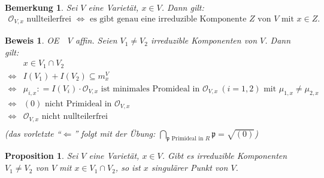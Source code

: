\documentclass[a4paper,12pt]{report}
\theoremstyle{break}
\newtheorem{Bem}[Def]{Bemerkung}
\newtheorem{Prop}[Def]{Proposition}
\theoremstyle{nonumberbreak}
\theoremstyle{nonumberplain}
\newtheorem{Bew}{Beweis}
\newcommand{\defeqr}[0]{\mathrel{\mathop:}=}
\renewcommand{\OE}{O\!\!E~}
\begin{document}
\begin{Bem}
  \label{bem:17.3}
  Sei $V$ eine Varietät, $x\in V$. Dann gilt:
  \begin{align*}
    \mathcal O_{V,x} \text{ nullteilerfrei } \Leftrightarrow\text{ es gibt genau eine irreduzible Komponente $Z$ von $V$ mit $x\in Z$. }
  \end{align*}
\end{Bem}
\begin{Bew}
  \OE\ $V$ affin. Seien $V_1\neq V_2$ irreduzible Komponenten von $V$. Dann gilt:
  \begin{align*}
    & x\in V_1\cap V_2 \\
    \Leftrightarrow & I(V_1)+I(V_2)\subseteq m_x^V \\
    \Leftrightarrow & \mu_{i,x}\defeqr I(V_i)\cdot\mathcal O_{V,x}\text{ ist minimales Promideal in }\mathcal O_{V,x} ~(i=1,2)\text{ mit } \mu_{1,x}\neq\mu_{2,x} \\
    \Leftrightarrow & (0) \text{ nicht Primideal in } \mathcal O_{V,x} \\
    \Leftrightarrow & \mathcal O_{V,x}\text{ nicht nullteilerfrei } \\
  \end{align*}
  (das vorletzte ``$\Leftarrow$'' folgt mit der Übung: $\bigcap_{\mathfrak p \text{ Primideal in $R$} }\mathfrak p=\sqrt{(0)}$)
\end{Bew}
\begin{Prop}
  \label{prop:17.4}
  Sei $V$ eine Varietät, $x\in V$. Gibt es irreduzible Komponenten $V_1\neq V_2$ von $V$ mit $x\in V_1\cap V_2$, so ist $x$
  singulärer Punkt von $V$.
\end{Prop}
\end{document}
